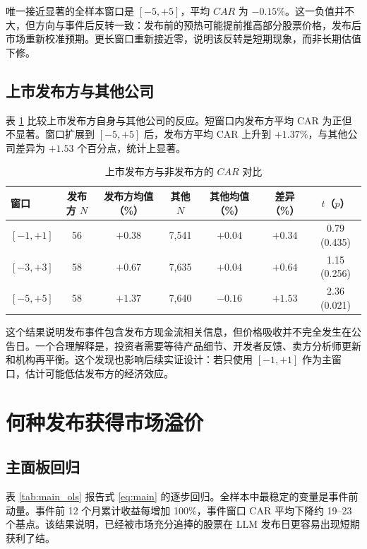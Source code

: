 \documentclass[11pt,fontset=fandol]{ctexart}
\begin{document}
唯一接近显著的全样本窗口是 $[-5,+5]$，平均 $CAR$ 为 $-0.15\%$。这一负值并不大，但方向与事件后反转一致：发布前的预热可能提前推高部分股票价格，发布后市场重新校准预期。更长窗口重新接近零，说明该反转是短期现象，而非长期估值下修。

\subsection{上市发布方与其他公司}

表 \ref{tab:pub_self} 比较上市发布方自身与其他公司的反应。短窗口内发布方平均 CAR 为正但不显著。窗口扩展到 $[-5,+5]$ 后，发布方平均 CAR 上升到 $+1.37\%$，与其他公司差异为 $+1.53$ 个百分点，统计上显著。

\begin{table}[htbp]
\centering
\caption{上市发布方与非发布方的 $CAR$ 对比}
\label{tab:pub_self}
\small
\begin{tabular}{lcccccc}
\toprule
窗口 & 发布方 $N$ & 发布方均值（\%） & 其他 $N$ & 其他均值（\%） & 差异（\%） & $t$（$p$） \\
\midrule
$[-1,+1]$ & 56 & $+0.38$ & 7{,}541 & $+0.04$ & $+0.34$ & 0.79 (0.435) \\
$[-3,+3]$ & 58 & $+0.67$ & 7{,}635 & $+0.04$ & $+0.64$ & 1.15 (0.256) \\
$[-5,+5]$ & 58 & $+1.37$ & 7{,}640 & $-0.16$ & $+1.53$ & 2.36 (0.021) \\
\bottomrule
\end{tabular}
\end{table}

这个结果说明发布事件包含发布方现金流相关信息，但价格吸收并不完全发生在公告日。一个合理解释是，投资者需要等待产品细节、开发者反馈、卖方分析师更新和机构再平衡。这个发现也影响后续实证设计：若只使用 $[-1,+1]$ 作为主窗口，估计可能低估发布方的经济效应。

\section{何种发布获得市场溢价}
\label{sec:cross}

\subsection{主面板回归}

表 \ref{tab:main_ols} 报告式 \eqref{eq:main} 的逐步回归。全样本中最稳定的变量是事件前动量。事件前 12 个月累计收益每增加 100\%，事件窗口 CAR 平均下降约 19--23 个基点。该结果说明，已经被市场充分追捧的股票在 LLM 发布日更容易出现短期获利了结。
\end{document}
